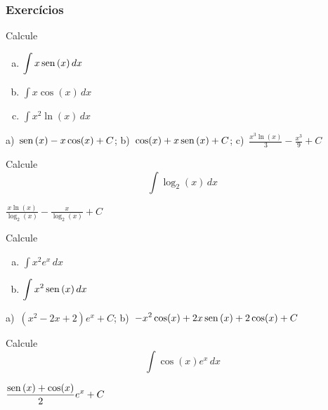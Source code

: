 \cleardoublepage\documentclass[../main.tex]{subfiles}
\begin{document}
\subsubsection{Exercícios}

\begin{exer}
  Calcule
  \begin{multicols}{3}
  \begin{enumerate}[a)]
  \item $\displaystyle \int x\operatorname{sen}\,(x)\,dx$
  \item $\displaystyle \int x\cos(x)\,dx$
  \item $\displaystyle \int x^2\ln(x)\,dx$
  \end{enumerate}\end{multicols}
\end{exer}
\begin{resp}
  a)~$\displaystyle \operatorname{sen}\,(x)-x\cos(x)+C$; b)~$\displaystyle \cos(x)+x\operatorname{sen}\,(x)+C$;  c)~$\displaystyle \frac{x^3\ln(x)}{3} - \frac{x^3}{9} + C$
\end{resp}

\begin{exer}
  Calcule
  \begin{equation*}
    \int\log_2(x)\,dx
  \end{equation*}
\end{exer}
\begin{resp}
  $\displaystyle \frac{x\ln(x)}{\log_2(x)}-\frac{x}{\log_2(x)} + C$
\end{resp}

\begin{exer}
  Calcule
  \begin{multicols}{2}
  \begin{enumerate}[a)]
  \item $\displaystyle \int x^2e^x\,dx$
  \item $\displaystyle \int x^2\operatorname{sen}\,(x)\,dx$
  \end{enumerate}\end{multicols}
\end{exer}
\begin{resp}
  a)~$\displaystyle \left(x^2-2x+2\right)e^x+C$; b)~$\displaystyle -x^2\cos(x)+2x\operatorname{sen}\,(x)+2\cos(x)+C$
\end{resp}

\begin{exer}
  Calcule
  \begin{equation*}
    \int\cos(x)e^x\,dx
  \end{equation*}
\end{exer}
\begin{resp}
  $\displaystyle \frac{\operatorname{sen}\,(x)+\cos(x)}{2}e^x + C$
\end{resp}
\end{document}
